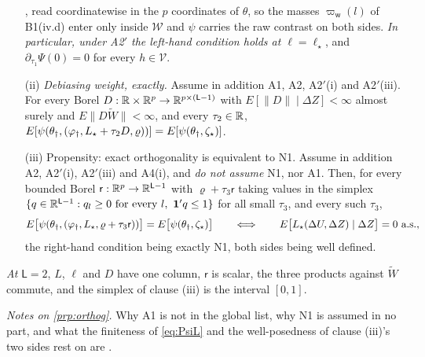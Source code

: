 \begin{proposition}
\begin{enumerate}
, read coordinatewise in the $p$ coordinates of $\theta$, so the masses
$\varpi_{\mathsf w}(l)$ of B1(iv.d) enter only inside $\mathcal W$ and
$\psi$ carries the raw contrast on both sides. \emph{In particular, under A2$'$ the left-hand condition
holds at $\ell=\ell_\star$}, and $\partial_{\tau_1}\Psi(0)=0$ for every $h\in\mathcal V$.
\item[(ii)] \emph{Debiasing weight, exactly.} Assume in addition A1, A2, A2$'$(i) and A2$'$(iii). For
every Borel $D:\mathbb{R}\times\mathbb{R}^{p}\to\mathbb{R}^{p\times(\mathsf L-1)}$ with
$E[\|D\|\mid\Delta Z]<\infty$ almost surely and $E\|D\widetilde W\|<\infty$, and every $\tau_2\in\mathbb{R}$,
$E[\psi(\theta_\dagger,(\varphi_{\dagger},L_\star+\tau_2D,\varrho))]=E[\psi(\theta_\dagger,\zeta_\star)]$.
\item[(iii)] Propensity: exact orthogonality is equivalent to N1. Assume in addition A2,
A2$'$(i), A2$'$(iii) and A4(i), and
\emph{do not assume} N1, nor A1. Then, for every bounded Borel
$\mathsf r:\mathbb{R}^{p}\to\mathbb{R}^{\mathsf L-1}$
with $\varrho+\tau_3\mathsf r$ taking values
in the simplex $\{q\in\mathbb{R}^{\mathsf L-1}:q_l\ge0\ \text{for every }l,\ \mathbf 1'q\le1\}$ for all small
$\tau_3$, and every such $\tau_3$,
\[
E\big[\psi(\theta_\dagger,(\vdagger,L_\star,\varrho+\tau_3\mathsf r))\big]=E\big[\psi(\theta_\dagger,\zeta_\star)\big]
\qquad\Longleftrightarrow\qquad
E\big[L_\star(\Delta U,\Delta Z)\mid\Delta Z\big]=0\ \text{a.s.},
\]
the right-hand condition being exactly N1, both sides being well defined.
\end{enumerate}
\emph{At $\mathsf L=2$}, $L$, $\ell$ and $D$ have one column, $\mathsf r$ is scalar, the three products
against $\widetilde W$ commute, and the simplex of clause \textup{(iii)} is the interval $[0,1]$.
\end{proposition}

\noindent\emph{Notes on \cref{prp:orthog}.} Why A1 is not in the global list, why N1 is assumed in no
part, and what the finiteness of \eqref{eq:PsiL} and the well-posedness of clause \textup{(iii)}'s two
sides rest on are .

